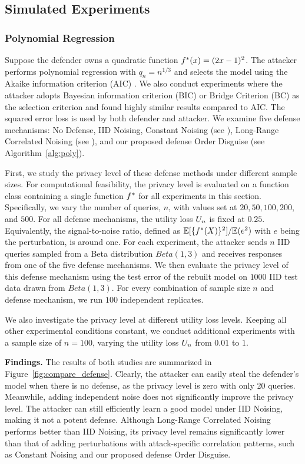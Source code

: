 \subsection{Simulated Experiments}
    
    \subsubsection{Polynomial Regression} 
    Suppose the defender owns a quadratic function $f^*(x) = (2x-1)^2$. The attacker performs polynomial regression with $q_n=n^{1/3}$ and selects the model using the Akaike information criterion (AIC) \citep{akaike1998information}. We also conduct experiments where the attacker adopts Bayesian information criterion (BIC) or Bridge Criterion (BC) \citep{ding2017bridging} as the selection criterion and found highly similar results compared to AIC. The squared error loss is used by both defender and attacker. 
    We examine five defense mechanisms: No Defense, IID Noising, Constant Noising (see ), Long-Range Correlated Noising (see ), and our proposed defense Order Disguise (see Algorithm~\ref{alg:poly}).

    First, we study the privacy level of these defense methods under different sample sizes. For computational feasibility, the privacy level is evaluated on a function class containing a single function $f^*$ for all experiments in this section.
    Specifically, we vary the number of queries, $n$, with values set at $20, 50, 100, 200$, and $500$.
    For all defense mechanisms, the utility loss $U_n$ is fixed at $0.25$. Equivalently, the signal-to-noise ratio, defined as $\mathbb{E}[\{f^*(X)\}^2]/\mathbb{E}(e^2)$ with $e$ being the perturbation, is around one. 
    For each experiment, the attacker sends $n$ IID queries sampled from a Beta distribution $Beta(1,3)$ and receives responses from one of the five defense mechanisms. We then evaluate the privacy level of this defense mechanism using the test error of the rebuilt model on $1000$ IID test data drawn from $Beta(1,3)$. For every combination of sample size $n$ and defense mechanism, we run $100$ independent replicates.

    We also investigate the privacy level at different utility loss levels. Keeping all other experimental conditions constant, we conduct additional experiments with a sample size of $n=100$, varying the utility loss $U_n$ from $0.01$ to $1$. 

    \textbf{Findings.}
    The results of both studies are summarized in Figure~\ref{fig:compare_defense}. 
    Clearly, the attacker can easily steal the defender's model when there is no defense, as the privacy level is zero with only 20 queries. Meanwhile, adding independent noise does not significantly improve the privacy level. The attacker can still efficiently learn a good model under IID Noising, making it not a potent defense. Although Long-Range Correlated Noising performs better than IID Noising, its privacy level remains significantly lower than that of adding perturbations with attack-specific correlation patterns, such as Constant Noising and our proposed defense Order Disguise. 
    
